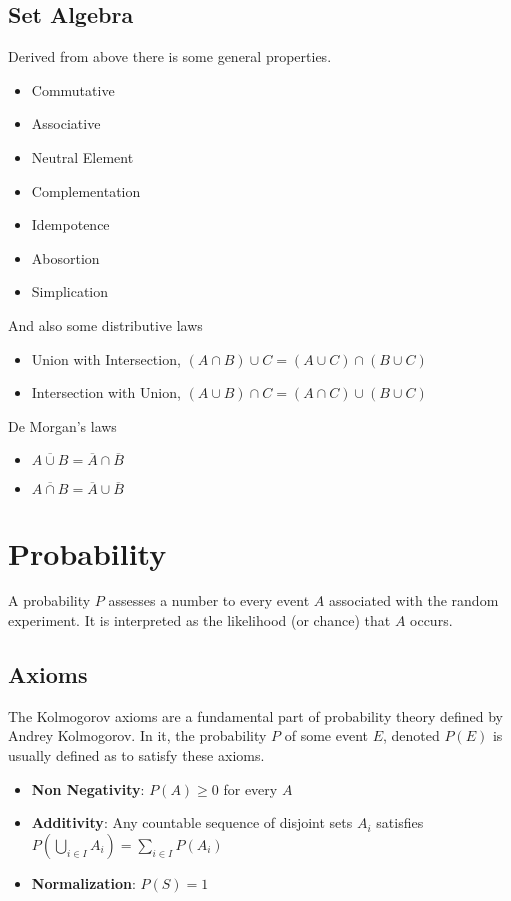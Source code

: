 \subsection{Set Algebra}
Derived from above there is some general properties.
\begin{itemize}
    \item Commutative
    \item Associative
    \item Neutral Element
    \item Complementation
    \item Idempotence
    \item Abosortion
    \item Simplication
\end{itemize}

And also some distributive laws
\begin{itemize}
    \item Union with Intersection, $(A \cap B)\cup C = (A\cup C) \cap (B \cup C) $
    \item Intersection with Union, $(A \cup B)\cap C = (A\cap C) \cup (B \cup C) $
\end{itemize}

De Morgan's laws
\begin{itemize}
    \item $\overline{A \cup B} = \overline{A} \cap \overline{B}$
    \item $\overline{A \cap B} = \overline{A} \cup \overline{B}$
\end{itemize}

\section{Probability}
A probability $P$ assesses a number to every event $A$ associated with the random experiment. It is interpreted as the likelihood (or chance) that $A$ occurs.

\subsection{Axioms}
The Kolmogorov axioms are a fundamental part of probability theory defined by Andrey Kolmogorov. In it, the probability $P$ of some event $E$, denoted $P(E)$ 
is usually defined as to satisfy these axioms. 
\begin{itemize}
    \item \textbf{Non Negativity}: $P(A) \geq 0$ for every $A$
    \item \textbf{Additivity}: Any countable sequence of disjoint sets $A_i$ satisfies $P(\bigcup_{i \in I} A_i) = \sum_{i \in I} P(A_i) $
    \item \textbf{Normalization}: $P(S)=1$
\end{itemize}

